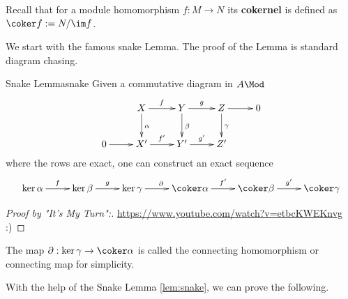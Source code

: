\documentclass[twoside = false,	%
		headsepline,		%
		parskip = true,
		]{scrbook}						%
\begin{document}
    Recall that for a module homomorphism $f: M \to N$ its \textbf{cokernel} is defined as $\coker f := N/\im f$.

    We start with the famous snake Lemma. The proof of the Lemma is standard diagram chasing.

    \begin{lemma}{Snake Lemma}{snake}
        Given a commutative diagram in $A\Mod$ 
        \begin{equation*}
        \xymatrix {
            & X \ar[r]^f \ar[d]^\alpha & Y \ar[r]^g \ar[d]^\beta & Z \ar[r] \ar[d]^\gamma & 0 \\
            0 \ar[r] & X' \ar[r]^{f'} & Y' \ar[r]^{g'} & Z'
        }
        \end{equation*}
        where the rows are exact, one can construct an exact sequence
        \begin{equation*}
        \xymatrix {
            \ker \alpha \ar[r]^f & \ker \beta \ar[r]^g & \ker \gamma \ar[r]^\partial & \coker \alpha \ar[r]^{f'} & \coker \beta \ar[r]^{g'} & \coker \gamma
        }
        \end{equation*}
    \end{lemma}

    \begin{proof}[Proof by "It's My Turn":]
        \url{https://www.youtube.com/watch?v=etbcKWEKnvg} :)
    \end{proof}

    The map $\partial: \ker \gamma \to \coker \alpha$ is called the connecting homomorphism or connecting map for simplicity.

    With the help of the Snake Lemma \ref{lem:snake}, we can prove the following.
\end{document}
